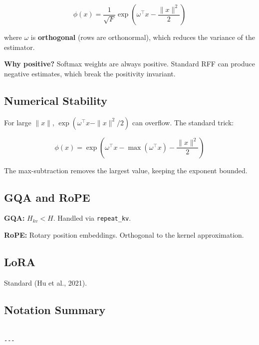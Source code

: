 \[
\phi(x) = \frac{1}{\sqrt{F}} \exp\!\left(\omega^\top x - \frac{\|x\|^2}{2}\right)
\tag{3.7}
\]

where $\omega$ is \textbf{orthogonal} (rows are orthonormal), which reduces the 
variance of the estimator.

\textbf{Why positive?} Softmax weights are always positive. Standard RFF can 
produce negative estimates, which break the positivity invariant.

\subsection{Numerical Stability}

For large $\|x\|$, $\exp(\omega^\top x - \|x\|^2/2)$ can overflow. The 
standard trick:

\[
\phi(x) = \exp\!\left(\omega^\top x - \max(\omega^\top x) - \frac{\|x\|^2}{2}\right)
\tag{3.8}
\]

The max-subtraction removes the largest value, keeping the exponent 
bounded.

\subsection{GQA and RoPE}

\textbf{GQA:} $H_{kv} < H$. Handled via \texttt{repeat\_kv}.

\textbf{RoPE:} Rotary position embeddings. Orthogonal to the kernel 
approximation.

\subsection{LoRA}

Standard (Hu et al., 2021).

\subsection{Notation Summary}

\begin{lstlisting}

---
\end{lstlisting}
